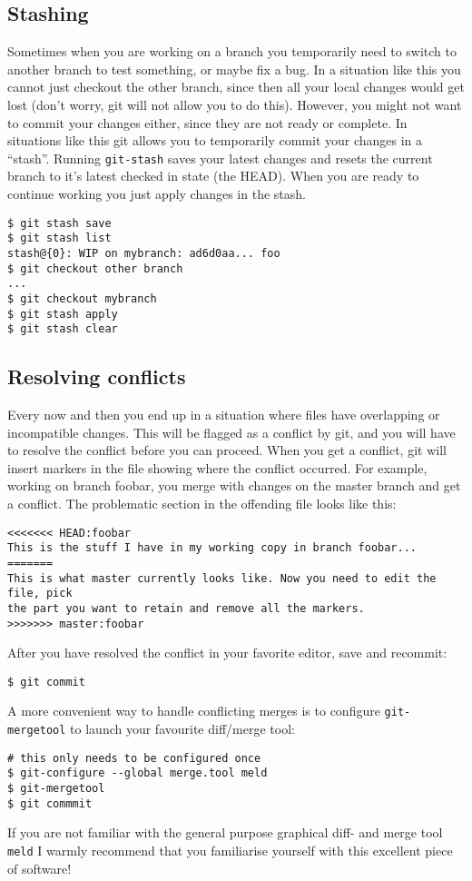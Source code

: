 \documentclass[a4paper,10pt]{article}
\begin{document}
\subsection{Stashing}
Sometimes when you are working on a branch you temporarily need to switch to
another branch to test something, or maybe fix a bug. In a situation like this
you cannot just checkout the other branch, since then all your local changes
would get lost (don't worry, git will not allow you to do this). However, you
might not want to commit your changes either, since they are not ready or
complete. In situations like this git allows you to temporarily commit your
changes in a ``stash''. Running \texttt{git-stash} saves your latest changes
and resets the current branch to it's latest checked in state (the HEAD). When
you are ready to continue working you just apply changes in the stash.
\begin{verbatim}
$ git stash save
$ git stash list
stash@{0}: WIP on mybranch: ad6d0aa... foo
$ git checkout other branch
...
$ git checkout mybranch
$ git stash apply
$ git stash clear
\end{verbatim}

\subsection{Resolving conflicts}
Every now and then you end up in a situation where files have overlapping or
incompatible changes. This will be flagged as a conflict by git, and you will
have to resolve the conflict before you can proceed. When you get a conflict,
git will insert markers in the file showing where the conflict occurred. For
example, working on branch foobar, you merge with changes on the master branch
and get a conflict. The problematic section in the offending file looks like
this:
\begin{verbatim}
<<<<<<< HEAD:foobar
This is the stuff I have in my working copy in branch foobar...
=======
This is what master currently looks like. Now you need to edit the file, pick
the part you want to retain and remove all the markers.
>>>>>>> master:foobar
\end{verbatim}
After you have resolved the conflict in your favorite editor, save and
recommit:
\begin{verbatim}
$ git commit
\end{verbatim}
A more convenient way to handle conflicting merges is to configure
\texttt{git-mergetool} to launch your favourite diff/merge tool:
\begin{verbatim}
# this only needs to be configured once
$ git-configure --global merge.tool meld
$ git-mergetool
$ git commmit
\end{verbatim}
If you are not familiar with the general purpose graphical diff- and merge
tool \texttt{meld} I warmly recommend that you familiarise yourself with this
excellent piece of software!
\end{document}
